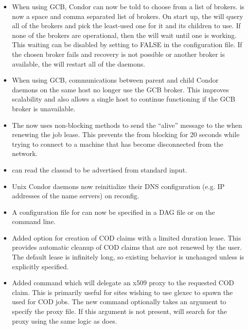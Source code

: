 \begin{itemize}
\item When using GCB, Condor can now be told to choose from a list of
brokers.  is now a space and comma separated
list of brokers. On start up, the  will query all of the
brokers and pick the least-used one for it and its children to use. If
none of the brokers are operational, then the  will wait
until one is working. This waiting can be disabled by setting 
 to FALSE in the configuration file.
If the chosen broker fails and recovery is not possible or another broker
is available, the  will restart all of the daemons.

\item When using GCB, communications between parent and child
Condor daemons on the same host no longer use the GCB broker.
This improves scalability and also allows a single host to
continue functioning if the GCB broker is unavailable.

\item The  now uses non-blocking methods to send the
``alive'' message to the  when renewing the job lease.
This prevents the  from blocking for 20 seconds while
trying to connect to a machine that has become disconnected from the
network.

\item {} can read the classad to be advertised from
standard input.

\item Unix Condor daemons now reinitialize their DNS
configuration (e.g. IP addresses of the name servers) on reconfig.

\item A configuration file for  can now be specified
in a DAG file or on the  command line.

\item Added  option  for creation of COD claims
with a limited duration lease.  This provides automatic cleanup of COD
claims that are not renewed by the user.  The default lease is infinitely
long, so existing behavior is unchanged unless  is explicitly
specified.

\item Added  command  which will
delegate an x509 proxy to the requested COD claim.
This is primarily useful for sites wishing to use glexec to spawn the
 used for COD jobs.
The new command optionally takes an  argument to
specify the proxy file.
If this argument is not present,  will search for the
proxy using the same logic as  does.


\end{itemize}
